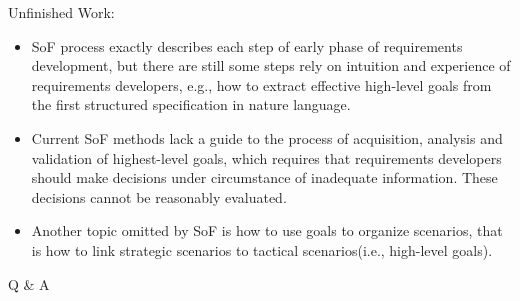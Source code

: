 ﻿\documentclass{beamer}
\begin{document}
\begin{frame}{Unfinished Work:}
  \small{
  \begin{itemize}  
  \item
    SoF process exactly describes each step of early phase of requirements development, but there are still some steps rely on intuition and experience of requirements developers, e.g., how to extract effective high-level goals from the first structured specification in nature language.
  \item 
    Current SoF methods lack a guide to the process of acquisition, analysis and validation of highest-level goals, which requires that requirements developers should make decisions under circumstance of inadequate information. These decisions cannot be reasonably evaluated.
  \item 
    Another topic omitted by SoF is how to use goals to organize scenarios, that is how to link strategic scenarios to tactical scenarios(i.e., high-level goals). \pause
  \end{itemize}
  }
\end{frame}  


\begin{frame}
  \begin{center}
    \Huge{Q \& A}
  \end{center}
\end{frame}  
\end{document}

